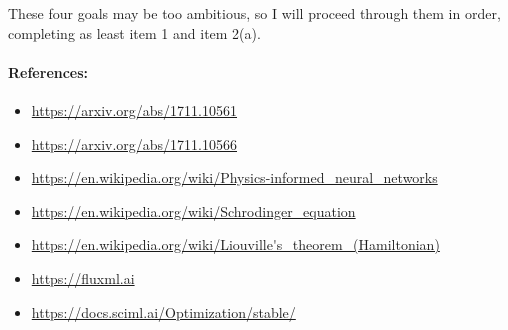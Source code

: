 \documentclass[10pt]{article}
\newcommand{\1}{\mathbf 1}
\begin{document}
These four goals may be too ambitious, so I will proceed through them in order, completing as least item 1 and item 2(a).

\paragraph{References:}

\begin{itemize}
	\item \url{https://arxiv.org/abs/1711.10561}
	\item \url{https://arxiv.org/abs/1711.10566}
	\item \url{https://en.wikipedia.org/wiki/Physics-informed_neural_networks}
	\item \url{https://en.wikipedia.org/wiki/Schrodinger_equation}
	\item \url{https://en.wikipedia.org/wiki/Liouville's_theorem_(Hamiltonian)}
	\item \url{https://fluxml.ai}
	\item \url{https://docs.sciml.ai/Optimization/stable/}
\end{itemize}
\end{document}
